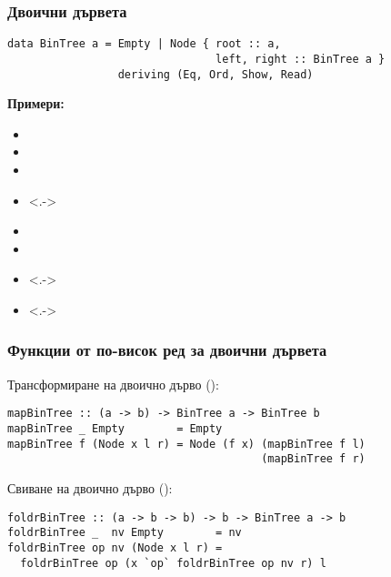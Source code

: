 \documentclass[alsotrans]{beamerswitch}
\begin{document}
\begin{frame}[fragile]
  \frametitle{Двоични дървета}
\begin{lstlisting}
data BinTree a = Empty | Node { root :: a,
                                left, right :: BinTree a }
                 deriving (Eq, Ord, Show, Read)
\end{lstlisting}
  \textbf{Примери:}
  \begin{itemize}[<+->]
  \item {}
  \item {}
  \item {}
  \item<.-> 
  \item {}
  \item {}
  \item<.-> 
  \item<.-> 
  \end{itemize}
\end{frame}

\begin{frame}[fragile]
  \frametitle{Функции от по-висок ред за двоични дървета}

  Трансформиране на двоично дърво ():
  \pause
\begin{lstlisting}
mapBinTree :: (a -> b) -> BinTree a -> BinTree b
mapBinTree _ Empty        = Empty
mapBinTree f (Node x l r) = Node (f x) (mapBinTree f l)
                                       (mapBinTree f r)
\end{lstlisting}
  \vspace{4ex}
  \pause
  Свиване на двоично дърво ():
\begin{lstlisting}
foldrBinTree :: (a -> b -> b) -> b -> BinTree a -> b
foldrBinTree _  nv Empty        = nv
foldrBinTree op nv (Node x l r) =
  foldrBinTree op (x `op` foldrBinTree op nv r) l
\end{lstlisting}
\end{frame}
\end{document}

